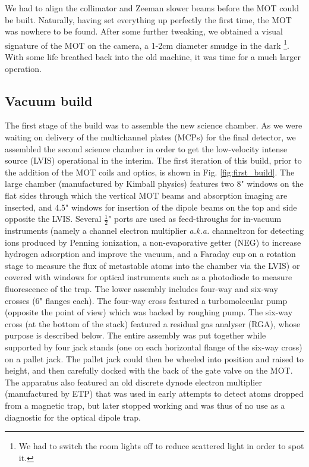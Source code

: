 	We had to align the collimator and Zeeman slower beams before the MOT could be built.
	Naturally, having set everything up perfectly the first time, the MOT was nowhere to be found.
	After some further tweaking, we obtained a visual signature of the MOT on the camera, a 1-2cm diameter smudge in the dark \footnote{We had to switch the room lights off to reduce scattered light in order to spot it.}.
	With some life breathed back into the old machine, it was time for a much larger operation.


\subsection{Vacuum build}

	
	The first stage of the build was to assemble the new science chamber.
	As we were waiting on delivery of the multichannel plates (MCPs) for the final detector, we assembled the second science chamber in order to get the low-velocity intense source (LVIS) operational in the interim.
	The first iteration of this build, prior to the addition of the MOT coils and optics, is shown in Fig. \ref{fig:first_build}.
	The large chamber (manufactured by Kimball physics) features two 8" windows on the flat sides through which the vertical MOT beams and absorption imaging are inserted, and 4.5" windows for insertion of the dipole beams on the top and side opposite the LVIS.
	Several $\frac{1}{2}$" ports are used as feed-throughs for in-vacuum instruments (namely a channel electron multiplier \emph{a.k.a.} channeltron for detecting ions produced by Penning ionization, a non-evaporative getter (NEG) to increase hydrogen adsorption and improve the vacuum, and a Faraday cup on a rotation stage to measure the flux of metastable atoms into the chamber via the LVIS) or covered with windows for optical instruments such as a photodiode to measure fluorescence of the trap.
	The lower assembly includes four-way and six-way crosses (6" flanges each).
	The four-way cross featured a turbomolecular pump (opposite the point of view) which was backed by roughing pump.
	The six-way cross (at the bottom of the stack) featured a residual gas analyser (RGA), whose purpose is described below.
	The entire assembly was put together while supported by four jack stands (one on each horizontal flange of the six-way cross) on a pallet jack.
	The pallet jack could then be wheeled into position and raised to height, and then carefully docked with the back of the gate valve on the MOT.
	The apparatus also featured an old discrete dynode electron multiplier (manufactured by ETP) that was used in early attempts to detect atoms dropped from a magnetic trap, but later stopped working and was thus of no use as a diagnostic for the optical dipole trap.

